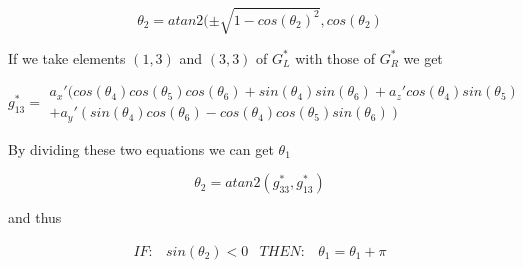 \begin{equation}
\theta_2 = atan2(\pm \sqrt{1-cos(\theta_2)^2}, cos(\theta_2)
\end{equation}

If we take elements $(1,3)$ and $(3,3)$ of $G^*_L$ with those of $G^*_R$ we get

\begin{equation}
g^*_{13} = \begin{array}{l} a_x'( cos(\theta_4)cos(\theta_5)cos(\theta_6) + sin(\theta_4)sin(\theta_6) + a_z'cos(\theta_4)sin(\theta_5) \\
+ a_y'(sin(\theta_4)cos(\theta_6)-cos(\theta_4)cos(\theta_5)sin(\theta_6))
\end{array}
\end{equation}

By dividing these two equations we can get $\theta_1$

\begin{equation}
\theta_2 = atan2(g^*_{33}, g^*_{13})
\end{equation}

and thus

\begin{equation}
\begin{array}{rcrc}IF:& sin(\theta_2)<0 & THEN: & \theta_1 = \theta_1 + \pi
\end{array}
\end{equation}